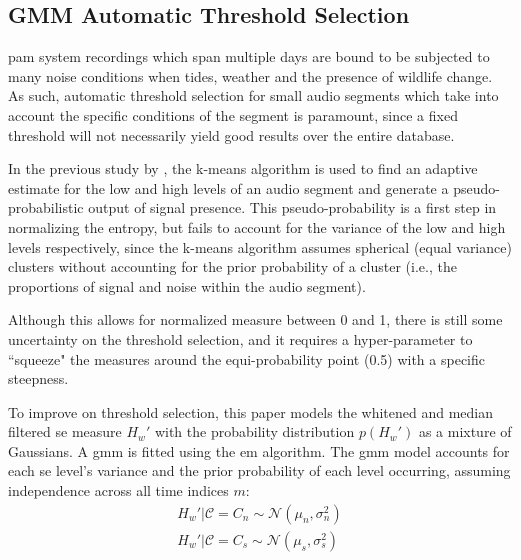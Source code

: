 {%

\subsection{GMM Automatic Threshold Selection}
\Ac{pam} system recordings which span multiple days are bound to be subjected to many noise conditions when tides, weather and the presence of wildlife change. As such, automatic threshold selection for small audio segments which take into account the specific conditions of the segment is paramount, since a fixed threshold will not necessarily yield good results over the entire database.

In the previous study by \citet{mypaper}, the k-means algorithm \citep{origkmeans} is used to find an adaptive estimate for the low and high levels of an audio segment and generate a pseudo-probabilistic output of signal presence. This pseudo-probability is a first step in normalizing the entropy, but fails to account for the variance of the low and high levels respectively, since the k-means algorithm assumes spherical (equal variance) clusters without accounting for the prior probability of a cluster (i.e., the proportions of signal and noise within the audio segment).

Although this allows for normalized measure between 0 and 1, there is still some uncertainty on the threshold selection, and it requires a hyper-parameter to  ``squeeze" the measures around the equi-probability point (0.5) with a specific steepness.

To improve on threshold selection, this paper models the whitened and median filtered \ac{se} measure $H_w'$ with the probability distribution $p(H_w')$ as a mixture of Gaussians. A \ac{gmm} is fitted using the \ac{em} algorithm. The \ac{gmm} model accounts for each \ac{se} level's variance and the prior probability of each level occurring, assuming independence across all time indices $m$:
\begin{gather}
    H_w' | \mathcal{C} = C_n \sim \mathcal{N}(\mu_n, \sigma_n^2) \\   
    H_w' | \mathcal{C} = C_s \sim \mathcal{N}(\mu_s, \sigma_s^2)
\end{gather}

}
